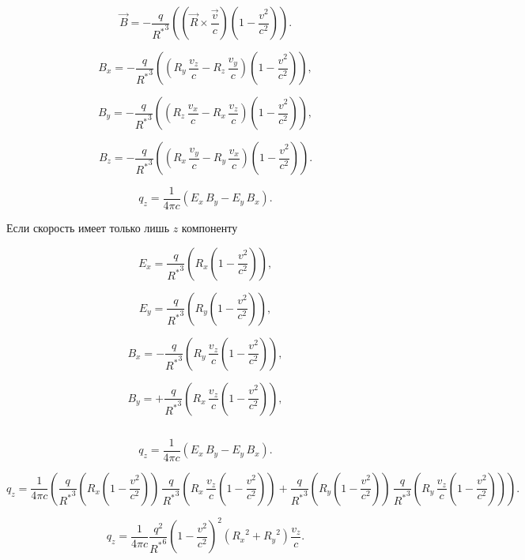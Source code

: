 \documentclass[11pt]{article}
\makeatletter
\newcommand{\boxspacing}{\kern\kvtcb@left@rule\kern\kvtcb@boxsep}
\newcommand{\prompt}[4]{
        {\ttfamily\llap{{\color{#2}[#3]:\hspace{3pt}#4}}\vspace{-\baselineskip}}
    }
\makeatother
\begin{document}
    \[\vec{B} = -\frac{q}{{{R}^{*}}^3}\left(\left(\vec{R}\times\frac{\vec{v}}{c}\right)\left(1 - \frac{v^2}{c^2}\right) \right).\]

    \[{B_x} = -\frac{q}{{{R}^{*}}^3}\left(\left(R_y\,\frac{v_z}{c} -  R_z\,\frac{v_y}{c}\right)\left(1 - \frac{v^2}{c^2}\right)\right),\]

    \[{B_y} = -\frac{q}{{{R}^{*}}^3}\left(\left(R_z\,\frac{v_x}{c} -  R_x\,\frac{v_z}{c}\right)\left(1 - \frac{v^2}{c^2}\right) \right),\]

    \[{B_z} = -\frac{q}{{{R}^{*}}^3}\left(\left(R_x\,\frac{v_y}{c} -  R_y\,\frac{v_x}{c}\right)\left(1 - \frac{v^2}{c^2}\right) \right).\]

    \[{q_z} = \frac{1}{4 \pi c} \left(E_x\,{B_y} -  E_y\,{B_x}\right).\]

    Если скорость имеет только лишь \(z\) компоненту

    \[{E_x} = \frac{q}{{{R}^{*}}^{3}}\left( {R_x} \left(1 - \frac{v^2}{c^2} \right) \right),\]

    \[{E_y} = \frac{q}{{{R}^{*}}^{3}}\left( {R_y} \left(1 - \frac{v^2}{c^2} \right) \right),\]

    \[{B_x} = -\frac{q}{{{R}^{*}}^3}\left(R_y\,\frac{v_z}{c} \left(1 - \frac{v^2}{c^2}\right)\right),\]

    \[{B_y} = +\frac{q}{{{R}^{*}}^3}\left(R_x\,\frac{v_z}{c}\left(1 - \frac{v^2}{c^2}\right) \right),\]

    \begin{tcolorbox}[breakable, size=fbox, boxrule=1pt, pad at break*=1mm,colback=cellbackground, colframe=cellborder]
\prompt{In}{incolor}{ }{\boxspacing}
\begin{Verbatim}[commandchars=\\\{\}]

\end{Verbatim}
\end{tcolorbox}

    \[{q_z} = \frac{1}{4 \pi c} \left(E_x\,{B_y} -  E_y\,{B_x}\right).\]

    \[{q_z} = \frac{1}{4 \pi c} \left(\frac{q}{{{R}^{*}}^{3}}\left( {R_x} \left(1 - \frac{v^2}{c^2} \right) \right)\,\frac{q}{{{R}^{*}}^3}\left(R_x\,\frac{v_z}{c}\left(1 - \frac{v^2}{c^2}\right) \right) + \frac{q}{{{R}^{*}}^{3}}\left( {R_y} \left(1 - \frac{v^2}{c^2} \right) \right)\,\frac{q}{{{R}^{*}}^3}\left(R_y\,\frac{v_z}{c} \left(1 - \frac{v^2}{c^2}\right)\right)\right).\]

    \[{q_z} = \frac{1}{4 \pi c}\frac{q^2}{{{R}^{*}}^{6}} \left(1 - \frac{v^2}{c^2} \right)^2
\left({R_x}^2 + {R_y}^2 \right)\frac{v_z}{c}.\]
\end{document}
